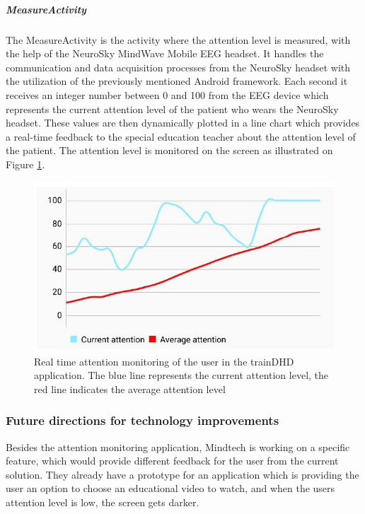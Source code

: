 \documentclass[letterpaper,10pt]{article}
\begin{document}
\subparagraph{MeasureActivity}

The MeasureActivity is the activity where the attention level is measured, with the help of the NeuroSky MindWave Mobile EEG headset. It handles the communication and data acquisition processes from the NeuroSky headset with the utilization of the previously mentioned Android framework. Each second it receives an integer number between 0 and 100 from the EEG device which represents the current attention level of the patient who wears the NeuroSky headset. These values are then dynamically plotted in a line chart which provides a real-time feedback to the special education teacher about the attention level of the patient. \cite{RicsiSzakdoga}
The attention level is monitored on the screen as illustrated on Figure \ref{img:attention}.


\begin{figure}[h]
\centering
\includegraphics[scale=0.4]{attention.JPG}
\caption[Real time attention monitoring of the user in the trainDHD application]{Real time attention monitoring of the user in the trainDHD application. The blue line represents the current attention level, the red line indicates the average attention level \cite{RicsiSzakdoga}}
\label{img:attention}
\end{figure}

\subsubsection{Future directions for technology improvements}

Besides the attention monitoring application, Mindtech is working on a specific feature, which would provide different feedback for the user from the current solution. They already have a prototype for an application which is providing the user an option to choose an educational video to watch, and when the users attention level is low, the screen gets darker.
\end{document}
